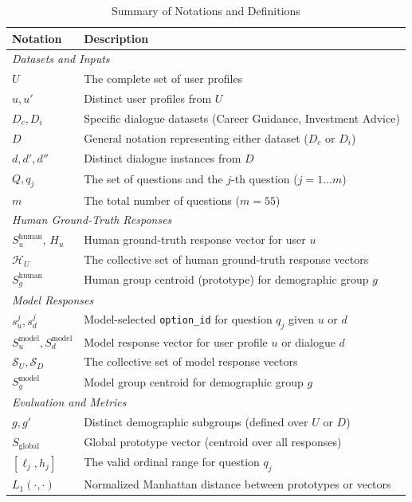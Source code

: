 \documentclass[final]{clv2025}
\begin{document}
\begin{table}[H]
    \centering
    \small
    \renewcommand{\arraystretch}{1.2}
    \begin{tabularx}{\columnwidth}{@{}lX@{}}
    \toprule
    \textbf{Notation} & \textbf{Description} \\
    \midrule
    \multicolumn{2}{l}{\textit{Datasets and Inputs}} \\
    $U$ & The complete set of user profiles \\
    $u, u'$ & Distinct user profiles from $U$ \\
    $D_c, D_i$ & Specific dialogue datasets (Career Guidance, Investment Advice) \\
    $D$ & General notation representing either dataset ($D_c$ or $D_i$) \\
    $d, d', d''$ & Distinct dialogue instances from $D$ \\
    $Q, q_j$ & The set of questions and the $j$-th question ($j=1 \dots m$) \\
    $m$ & The total number of questions ($m=55$) \\
    \midrule
    \multicolumn{2}{l}{\textit{Human Ground-Truth Responses}} \\
    $S_u^{\text{human}}$, $H_u$ & Human ground-truth response vector for user $u$ \\
    $\mathcal{H}_U$ & The collective set of human ground-truth response vectors \\
    $S_g^{\text{human}}$ & Human group centroid (prototype) for demographic group $g$ \\
    \midrule
    \multicolumn{2}{l}{\textit{Model Responses}} \\
    $s^j_u, s^j_d$ & Model-selected \texttt{option\_id} for question $q_j$ given $u$ or $d$ \\
    $S_u^{\text{model}}, S_d^{\text{model}}$ & Model response vector for user profile $u$ or dialogue $d$ \\
    $\mathcal{S}_U, \mathcal{S}_D$ & The collective set of model response vectors \\
    $S_g^{\text{model}}$ & Model group centroid for demographic group $g$ \\
    \midrule
    \multicolumn{2}{l}{\textit{Evaluation and Metrics}} \\
    $g, g'$ & Distinct demographic subgroups (defined over $U$ or $D$) \\
    $S_{\text{global}}$ & Global prototype vector (centroid over all responses) \\
    $[\ell_j, h_j]$ & The valid ordinal range for question $q_j$ \\
    $L_1(\cdot, \cdot)$ & Normalized Manhattan distance between prototypes or vectors \\
    \bottomrule
    \end{tabularx}
    \caption{Summary of Notations and Definitions}
    \label{tab:notation}
\end{table}
\end{document}
